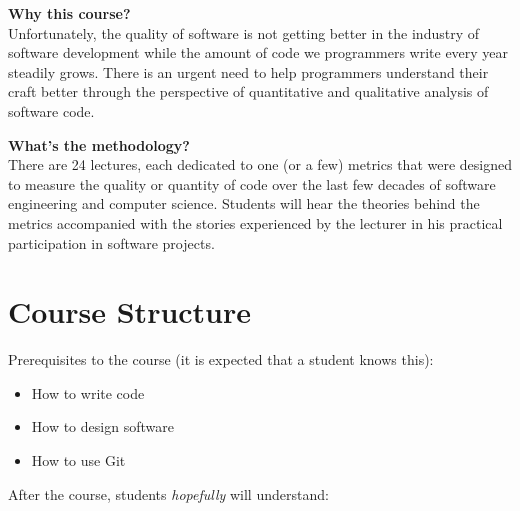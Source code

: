 \documentclass[nobrand,anonymous,nodate,nosecurity]{huawei}
\begin{document}
{\textbf{Why this course?}\\
Unfortunately, the quality of software is not getting better in the
industry of software development while the amount of code we programmers
write every year steadily grows. There is an urgent need to help
programmers understand their craft better through the perspective
of quantitative and qualitative analysis of software code.

\textbf{What's the methodology?}\\
There are 24 lectures, each dedicated to one (or a few) metrics that
were designed to measure the quality or quantity of code over the last
few decades of software engineering and computer science. Students will
hear the theories behind the metrics accompanied with the stories
experienced by the lecturer in his practical participation in software
projects.

\newpage
\section*{Course Structure}

Prerequisites to the course (it is expected that a student knows this):

\begin{itemize}
\item How to write code
\item How to design software
\item How to use Git
\end{itemize}

After the course, students \emph{hopefully} will understand:

}
\end{document}
